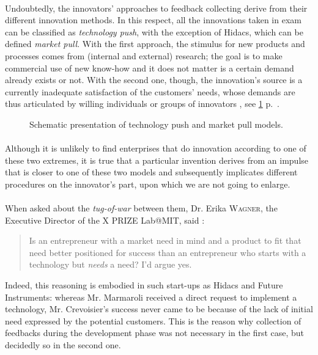\documentclass[twoside]{report}
\begin{document}
\paragraph{}
Undoubtedly, the innovators' approaches to feedback collecting derive from their different innovation methods. In this respect, all the innovations taken in exam can be classified as \emph{technology push}, with the exception of Hidacs, which can be defined \emph{market pull}. With the first approach, the stimulus for new products and processes comes from (internal and external) research; the goal is to make commercial use of new know-how and it does not matter is a certain demand already exists or not. With the second one, though, the innovation's source is a currently inadequate satisfaction of the customers' needs, whose demands are thus articulated by willing individuals or groups of innovators \cite{brem_2009_integration}, see \ref{fig:models} p.~\pageref{fig:models}.
\begin{figure}
\begin{center}
\caption{Schematic presentation of technology push and market pull models.}
\label{fig:models}
\end{center}
\end{figure}
\paragraph{}
Although it is unlikely to find enterprises that do innovation according to one of these two extremes, it is true that a particular invention derives from an impulse that is closer to one of these two models and subsequently implicates different procedures on the innovator's part, upon which we are not going to enlarge.
\paragraph{}
When asked about the \emph{tug-of-war} between them, Dr. Erika \textsc{Wagner}, the Executive Director of the X PRIZE Lab@MIT, said \cite{awolfson_entrepreneurship_2010} : \begin{quote}Is an entrepreneur with a market need in mind and a product to fit that need better positioned for success than an entrepreneur who starts with a technology but \emph{needs} a need? I'd argue yes.\end{quote} Indeed, this reasoning is embodied in such start-ups as Hidacs and Future Instruments: whereas Mr. Marmaroli received a direct request to implement a technology, Mr. Crevoisier's success never came to be because of the lack of initial need expressed by the potential customers. This is the reason why collection of feedbacks during the development phase was not necessary in the first case, but decidedly so in the second one.
\end{document}
